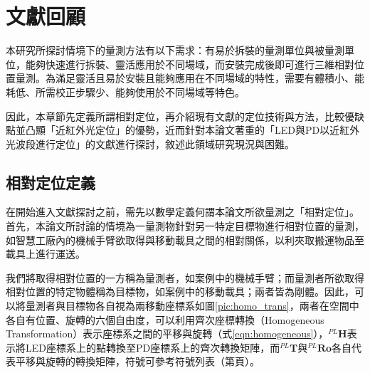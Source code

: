 \chapter{文獻回顧}







本研究所探討情境下的量測方法有以下需求：有易於拆裝的量測單位與被量測單位，能夠快速進行拆裝、靈活應用於不同場域，而安裝完成後即可進行三維相對位置量測。為滿足靈活且易於安裝且能夠應用在不同場域的特性，需要有體積小、能耗低、所需校正步驟少、能夠使用於不同場域等特色。

因此，本章節先定義所謂相對定位，再介紹現有文獻的定位技術與方法，比較優缺點並凸顯「近紅外光定位」的優勢，近而針對本論文著重的「LED與PD以近紅外光波段進行定位」的文獻進行探討，敘述此領域研究現況與困難。








\section{相對定位定義}
\label{chp:relative}
    
    在開始進入文獻探討之前，需先以數學定義何謂本論文所欲量測之「相對定位」。首先，本論文所討論的情境為一量測物針對另一特定目標物進行相對位置的量測，如智慧工廠內的機械手臂欲取得與移動載具之間的相對關係，以利夾取搬運物品至載具上進行運送。
    
    我們將取得相對位置的一方稱為量測者，如案例中的機械手臂；而量測者所欲取得相對位置的特定物體稱為目標物，如案例中的移動載具；兩者皆為剛體。因此，可以將量測者與目標物各自視為兩移動座標系如圖\ref{pic:homo_trans}，兩者在空間中各自有位置、旋轉的六個自由度，可以利用齊次座標轉換（Homogeneous Transformation）表示座標系之間的平移與旋轉（式\ref{eqn:homogeneous}），$^{PL}\boldsymbol{H}$表示將LED座標系上的點轉換至PD座標系上的齊次轉換矩陣，而$^{PL}\boldsymbol{T}$與$^{PL}\boldsymbol{Ro}$各自代表平移與旋轉的轉換矩陣，符號可參考符號列表（第\pageref{chp:symbol}頁）。
  
